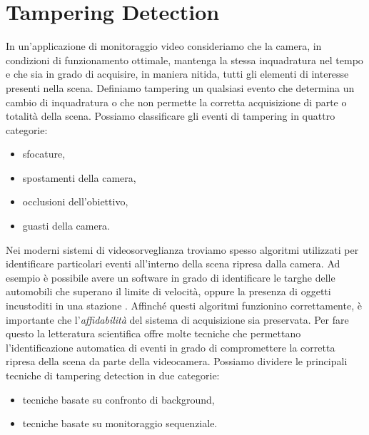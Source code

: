 \section{Tampering Detection}
In un'applicazione di monitoraggio video consideriamo che la camera, in condizioni di funzionamento ottimale, mantenga la stessa inquadratura nel tempo e che sia in grado di acquisire, in maniera nitida, tutti gli elementi di interesse presenti nella scena.
Definiamo \gls{tampering} un qualsiasi evento che determina un cambio di inquadratura o che non permette la corretta acquisizione di parte o totalit\`a della scena.
Possiamo classificare gli eventi di tampering in quattro categorie:
\begin{itemize}
	\item sfocature,
	\item spostamenti della camera,
	\item occlusioni dell'obiettivo,
	\item guasti della camera.
\end{itemize}
Nei moderni sistemi di videosorveglianza troviamo spesso algoritmi utilizzati per identificare particolari eventi all'interno della scena ripresa dalla camera. 
Ad esempio \`e possibile avere un software in grado di identificare le targhe delle automobili che superano il limite di velocit\`a, oppure la presenza di oggetti incustoditi in una stazione \cite{Targhe}.
Affinch\'e questi algoritmi funzionino correttamente, \`e importante che l'\textit{affidabilit\`a} del sistema di acquisizione sia preservata.
Per fare questo la letteratura scientifica offre molte tecniche che permettano l'identificazione automatica di eventi in grado di compromettere la corretta ripresa della scena da parte della videocamera.
Possiamo dividere le principali tecniche di tampering detection in due categorie: 
\begin{itemize}
	\item tecniche basate su confronto di background,
	\item tecniche basate su monitoraggio sequenziale.
\end{itemize}
